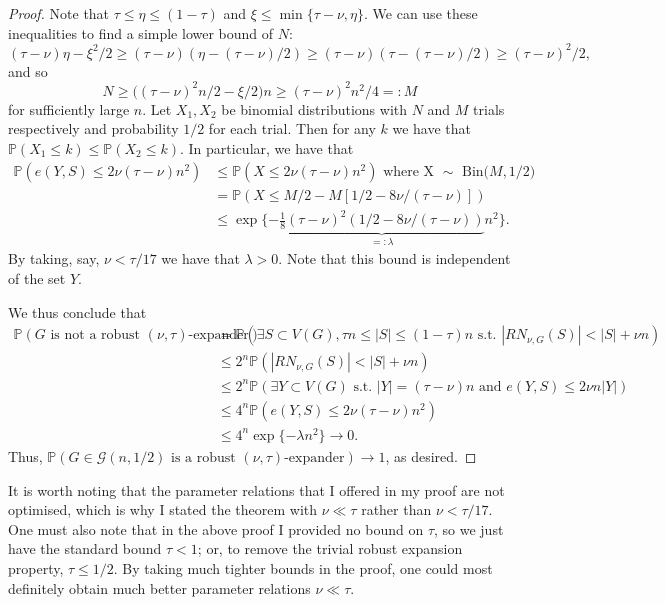 \documentclass[10pt,letterpaper, reqno]{amsart}
\theoremstyle{definition}
\numberwithin{equation}{section}
\begin{document}
\begin{proof}
	Note that $\tau \leq \eta \leq (1-\tau)$ and $\xi \leq \min\{ \tau-\nu,\eta \}$. We can use these inequalities to find a simple lower bound of $N$:
	$$(\tau - \nu)\eta - \xi ^2/2 \geq (\tau - \nu)(\eta - (\tau-\nu)/2) \geq (\tau-\nu)(\tau - (\tau-\nu)/2) \geq (\tau-\nu)^2/2,$$
	and so 
	$$N \geq \big((\tau-\nu)^2n/2 - \xi/2\big)n \geq (\tau-\nu)^2n^2/4 =: M$$
	for sufficiently large $n$. Let $X_1, X_2$ be binomial distributions with $N$ and $M$ trials respectively and probability $1/2$ for each trial. Then for any $k$ we have that $\mathbb{P}(X_1 \leq k) \leq \mathbb{P}(X_2 \leq k)$. In particular, we have that
	\begin{align*}
	\mathbb{P}(e(Y,S) \leq 2\nu(\tau-\nu)n^2) &\leq \mathbb{P}(X \leq 2\nu(\tau-\nu)n^2) \text{ where X $\sim$ Bin($M,1/2$)} \\
	&= \mathbb{P}(X \leq M/2 - M[1/2 - 8\nu/(\tau-\nu)])
	\\ &\leq \exp\{ -\underbrace{\frac{1}{8}(\tau-\nu)^2(1/2-8\nu/(\tau-\nu))}_{=:\lambda}n^2 \}.
	\end{align*}
	By taking, say, $\nu < \tau /17  $ we have that $\lambda > 0$. Note that this bound is independent of the set $Y$.
	
	
	We thus conclude that 
	\begin{align*}
	\mathbb{P}(\text{$G$ is not a robust $(\nu,\tau)$-expander}) &= \mathbb{P}(\exists S \subset V(G), \tau n \leq |S| \leq (1-\tau)n \text{ s.t. } |RN_{\nu,G}(S)|<|S| + \nu n)  \\
	& \leq 2^n \mathbb{P}(|RN_{\nu,G}(S)| < |S| + \nu n) \\
	& \leq 2^n \mathbb{P}(\exists Y \subset V(G) \text{ s.t. } |Y|=(\tau-\nu)n \text{ and }e(Y,S) \leq 2 \nu n|Y|) \\
	& \leq 4^n \mathbb{P}(e(Y,S) \leq 2\nu(\tau-\nu)n^2) \\
	& \leq 4^n \exp\{-\lambda n^2\} \to 0.
	\end{align*}
	Thus, $\mathbb{P}(G \in \mathcal{G}(n, 1/2) \text{ is a robust } (\nu,\tau)\text{-expander}) \to 1$, as desired.
\end{proof}

\noindent It is worth noting that the parameter relations that I offered in my proof are not optimised, which is why I stated the theorem with $\nu \ll \tau$ rather than $\nu < \tau/17$. One must also note that in the above proof I provided no bound on $\tau$, so we just have the standard bound $\tau <1$; or, to remove the trivial robust expansion property, $\tau \leq 1/2$. By taking much tighter bounds in the proof, one could most definitely obtain much better parameter relations $\nu \ll \tau$.
\end{document}
